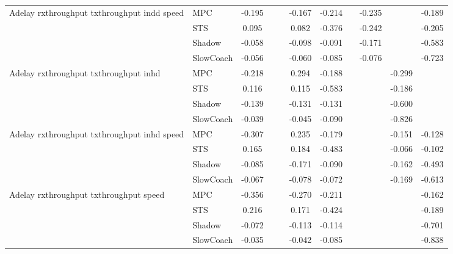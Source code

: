 \begin{tabular}{|l|l|*{9}{c|}}
\midrule
Adelay rxthroughput txthroughput indd speed    & MPC &   -0.195 &        &        & -0.167 & -0.214 &     &  -0.235 &      &   -0.189 \\
                              & STS &    0.095 &        &        &  0.082 & -0.376 &     &  -0.242 &      &   -0.205 \\
                              & Shadow &   -0.058 &        &        & -0.098 & -0.091 &     &  -0.171 &      &   -0.583 \\
                              & SlowCoach &   -0.056 &        &        & -0.060 & -0.085 &     &  -0.076 &      &   -0.723 \\
\midrule
Adelay rxthroughput txthroughput inhd    & MPC &   -0.218 &        &        &  0.294 & -0.188 &     &      &  -0.299 &       \\
                              & STS &    0.116 &        &        &  0.115 & -0.583 &     &      &  -0.186 &       \\
                              & Shadow &   -0.139 &        &        & -0.131 & -0.131 &     &      &  -0.600 &       \\
                              & SlowCoach &   -0.039 &        &        & -0.045 & -0.090 &     &      &  -0.826 &       \\
\midrule
Adelay rxthroughput txthroughput inhd speed    & MPC &   -0.307 &        &        &  0.235 & -0.179 &     &      &  -0.151 &   -0.128 \\
                              & STS &    0.165 &        &        &  0.184 & -0.483 &     &      &  -0.066 &   -0.102 \\
                              & Shadow &   -0.085 &        &        & -0.171 & -0.090 &     &      &  -0.162 &   -0.493 \\
                              & SlowCoach &   -0.067 &        &        & -0.078 & -0.072 &     &      &  -0.169 &   -0.613 \\
\midrule
Adelay rxthroughput txthroughput speed    & MPC &   -0.356 &        &        & -0.270 & -0.211 &     &      &      &   -0.162 \\
                              & STS &    0.216 &        &        &  0.171 & -0.424 &     &      &      &   -0.189 \\
                              & Shadow &   -0.072 &        &        & -0.113 & -0.114 &     &      &      &   -0.701 \\
                              & SlowCoach &   -0.035 &        &        & -0.042 & -0.085 &     &      &      &   -0.838 \\

\end{tabular}
